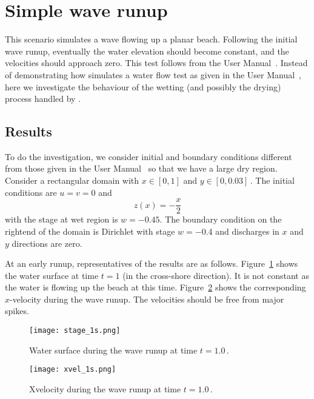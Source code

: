 \section{Simple wave runup}
This scenario simulates a wave flowing up a planar beach. Following the initial wave runup, eventually the water elevation should become constant, and the velocities should approach zero. This test follows from the \anuga{} User Manual~\cite{RNGS2010}.
Instead of demonstrating how \anuga{} simulates a water flow test as given in the \anuga{} User Manual~\cite{RNGS2010}, here we investigate the behaviour of the wetting (and possibly the drying) process handled by \anuga{}.

\subsection{Results}
To do the investigation, we consider initial and boundary conditions different from those given in the \anuga{} User Manual~\cite{RNGS2010} so that we have a large dry region. Consider a rectangular domain with $x\in[0,1]$ and $y\in[0,0.03]$\,. The initial conditions are $u=v=0$ and 
\begin{equation}
z(x) = -\frac{x}{2}
\end{equation}
with the stage at wet region is $w=-0.45$. The boundary condition on the rightend of the domain is Dirichlet with stage $w=-0.4$ and discharges in $x$ and $y$ directions are zero.

At an early runup, representatives of the results are as follows. Figure~\ref{fig:stage_1s} shows the water surface at time $t=1$ (in the cross-shore direction). It is not constant as the water is flowing up the beach at this time. Figure~\ref{fig:xvel_1s} shows the corresponding $x$-velocity during the wave runup. The velocities should be free from major spikes.
\begin{figure}
\begin{center}
\texttt{[image: stage\_1s.png]}
\caption{Water surface during the wave runup at time $t=1.0$\,.}
\label{fig:stage_1s}
\end{center}
\end{figure}

\begin{figure}
\begin{center}
\texttt{[image: xvel\_1s.png]}
\caption{Xvelocity during the wave runup at time $t=1.0$\,.}
\label{fig:xvel_1s}
\end{center}
\end{figure}

